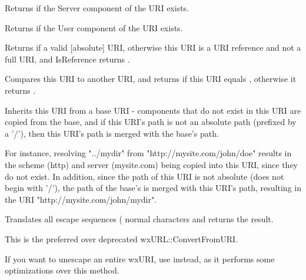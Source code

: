 \label{wxurihasserver}


Returns \true if the Server component of the URI exists.


\label{wxurihasuserinfo}


Returns \true if the User component of the URI exists.


\label{wxuriisreference}


Returns \true if a valid [absolute] URI, otherwise this URI
is a URI reference and not a full URI, and IsReference
returns \false.


\label{wxurioperatorcompare}


Compares this URI to another URI, and returns \true if 
this URI equals , otherwise it returns \false.



\label{wxuriresolve}


Inherits this URI from a base URI - components that do not
exist in this URI are copied from the base, and if this URI's
path is not an absolute path (prefixed by a '/'), then this URI's
path is merged with the base's path.

For instance, resolving "../mydir" from "http://mysite.com/john/doe" 
results in the scheme (http) and server (mysite.com) being copied into 
this URI, since they do not exist.  In addition, since the path
of this URI is not absolute (does not begin with '/'), the path
of the base's is merged with this URI's path, resulting in the URI
"http://mysite.com/john/mydir".


\label{wxuriunescape}


Translates all escape sequences (%
normal characters and returns the result.

This is the preferred over deprecated wxURL::ConvertFromURI.

If you want to unescape an entire wxURI, use  instead,
as it performs some optimizations over this method.



